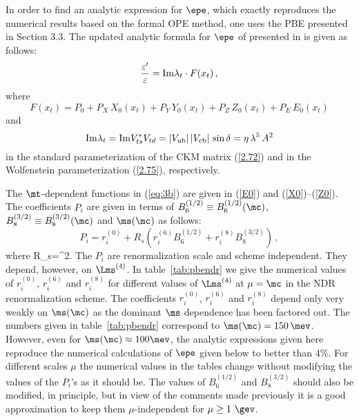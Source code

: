 In order to find an analytic expression for $\epe$, which exactly
reproduces the numerical results based on the formal OPE method,
one uses the PBE presented in Section 3.3. The updated  
analytic formula for $\epe$ of \cite{buraslauten:93} 
presented in \cite{BJL96a}
is given as follows:
\begin{equation}
\frac{\varepsilon'}{\varepsilon} = {\rm Im}\lambda_t \cdot F(x_t) \, ,
\label{eq:3}
\end{equation}
where
\begin{equation}
F(x_t) =
P_0 + P_X \, X_0(x_t) + P_Y \, Y_0(x_t) + P_Z \, Z_0(x_t) 
+ P_E \, E_0(x_t) 
\label{eq:3b}
\end{equation}
and
\begin{equation}
{\rm Im}\lambda_t = {\rm Im} V_{ts}^*V_{td} = |V_{\rm ub}| \, 
|V_{\rm cb}| \, \sin \delta = \eta \, \lambda^5 \, A^2
\label{eq:4}
\end{equation}
in the standard parameterization of the CKM matrix
(\ref{2.72}) and in the Wolfenstein parameterization
(\ref{2.75}), respectively. 

The $\mt$-dependent functions in (\ref{eq:3b}) are given in 
(\ref{E0}) and (\ref{X0})--(\ref{Z0}).
The coefficients $P_i$ are given in terms of $B_6^{(1/2)} \equiv
B_6^{(1/2)}(\mc)$, $B_8^{(3/2)} \equiv B_8^{(3/2)}(\mc)$ and $\ms(\mc)$
as follows:
\begin{equation}
P_i = r_i^{(0)} + R_s 
\left(r_i^{(6)} B_6^{(1/2)} + r_i^{(8)} B_8^{(3/2)} \right) \, ,
\label{eq:pbePi}
\end{equation}
where
\be\label{RS}
R_s=\left[ \frac{158\mev}{\ms(\mc)+\md(\mc)} \right]^2.
\ee
The $P_i$ are renormalization scale and scheme independent. They depend,
however, on $\Lms^{(4)}$. In table~\ref{tab:pbendr} we give the numerical
values of $r_i^{(0)}$, $r_i^{(6)}$ and $r_i^{(8)}$ for different values
of $\Lms^{(4)}$ at $\mu=\mc$ in the NDR renormalization scheme. 
The
coefficients $r_i^{(0)}$, $r_i^{(6)}$ and $r_i^{(8)}$ depend only very
weakly on
$\ms(\mc)$ as the dominant $\ms$ dependence has been factored out. The
numbers given in table~\ref{tab:pbendr} correspond to $\ms(\mc)=150\,\mev$.
However, even for $\ms(\mc)\approx100\mev$, the analytic expressions given
here reproduce the numerical calculations of $\epe$ given below 
to better than $4\%$.
For different scales $\mu$ the numerical values in the tables change
without modifying the values of the $P_i$'s as it should be. The values
of $B_6^{(1/2)}$ and $B_8^{(3/2)}$ should also be  modified, 
in principle, but in view of the comments made previously it
is a good approximation to keep them $\mu$-independent
for $\mu\ge 1~\gev$.

